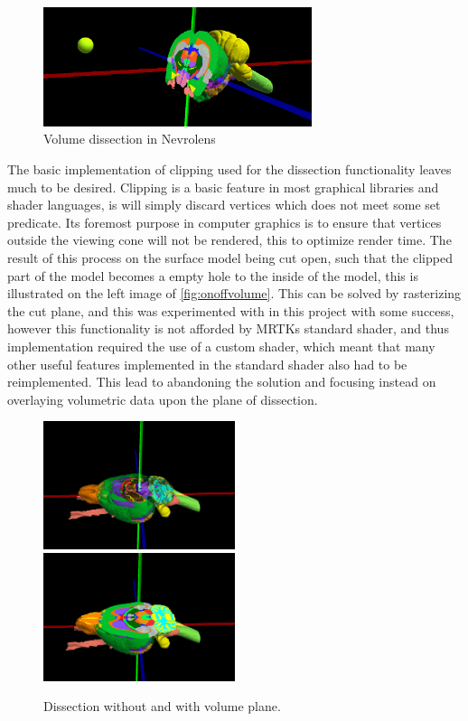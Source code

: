 \begin{figure}[H]
    \centering
    \includegraphics[width=0.7\textwidth]{fig/volumdissectionoverview.png}
    \caption{Volume dissection in Nevrolens}
\end{figure}

The basic implementation of clipping used for the dissection functionality leaves much to be desired. Clipping is a basic feature in most graphical libraries and shader languages, is will simply discard vertices which does not meet some set predicate. Its foremost purpose in computer graphics is to ensure that vertices outside the viewing cone will not be rendered, this to optimize render time. The result of this process on the surface model being cut open, such that the clipped part of the model becomes a empty hole to the inside of the model, this is illustrated on the left image of \autoref{fig:onoffvolume}. This can be solved by rasterizing the cut plane, and this was experimented with in this project with some success, however this functionality is not afforded by MRTKs standard shader, and thus implementation required the use of a custom shader, which meant that many other useful features implemented in the standard shader also had to be reimplemented. This lead to abandoning the solution and focusing instead on overlaying volumetric data upon the plane of dissection. 
\begin{figure}[ht]
    \includegraphics[width=0.5\textwidth , trim={3cm 2cm 4cm 5cm}, clip]{fig/top_mrtkdissect2.png}
    \includegraphics[width=0.5\textwidth , trim={3cm 2cm 4cm 5cm}, clip]{fig/top_volumedissect2.png}
    \caption{Dissection without and with volume plane.}
    \label{fig:onoffvolume}
\end{figure}


